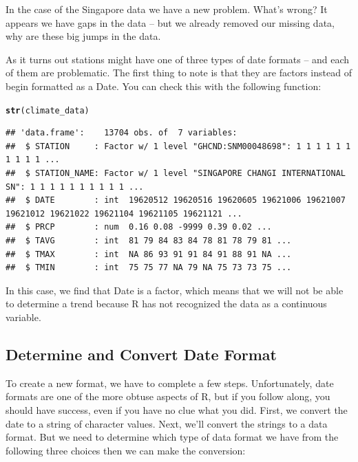 \documentclass{article}\usepackage[]{graphicx}\usepackage[]{color}
\makeatletter
\newcommand{\hlstd}[1]{\textcolor[rgb]{0.345,0.345,0.345}{#1}}%
\newcommand{\hlkwd}[1]{\textcolor[rgb]{0.737,0.353,0.396}{\textbf{#1}}}%
\newenvironment{kframe}{%
 \def\at@end@of@kframe{}%
 \ifinner\ifhmode%
  \def\at@end@of@kframe{\end{minipage}}%
  \begin{minipage}{\columnwidth}%
 \fi\fi%
 \def\FrameCommand##1{\hskip\@totalleftmargin \hskip-\fboxsep
 \colorbox{shadecolor}{##1}\hskip-\fboxsep
     \hskip-\linewidth \hskip-\@totalleftmargin \hskip\columnwidth}%
 \MakeFramed {\advance\hsize-\width
   \@totalleftmargin\z@ \linewidth\hsize
   \@setminipage}}%
 {\par\unskip\endMakeFramed%
 \at@end@of@kframe}
\newenvironment{knitrout}{}{} %
\makeatother
\begin{document}
In the case of the Singapore data we have a new problem. What's wrong? It appears we have gaps in the data -- but we already removed our missing data, why are these big jumps in the data.

As it turns out stations might have one of three types of date formats -- and each of them are problematic. The first thing to note is that they are factors instead of begin formatted as a Date. You can check this with the following function:

\begin{knitrout}
\color{fgcolor}\begin{kframe}
\begin{alltt}
\hlkwd{str}\hlstd{(climate_data)}
\end{alltt}
\begin{verbatim}
## 'data.frame':	13704 obs. of  7 variables:
##  $ STATION     : Factor w/ 1 level "GHCND:SNM00048698": 1 1 1 1 1 1 1 1 1 1 ...
##  $ STATION_NAME: Factor w/ 1 level "SINGAPORE CHANGI INTERNATIONAL SN": 1 1 1 1 1 1 1 1 1 1 ...
##  $ DATE        : int  19620512 19620516 19620605 19621006 19621007 19621012 19621022 19621104 19621105 19621121 ...
##  $ PRCP        : num  0.16 0.08 -9999 0.39 0.02 ...
##  $ TAVG        : int  81 79 84 83 84 78 81 78 79 81 ...
##  $ TMAX        : int  NA 86 93 91 91 84 91 88 91 NA ...
##  $ TMIN        : int  75 75 77 NA 79 NA 75 73 73 75 ...
\end{verbatim}
\end{kframe}
\end{knitrout}

In this case, we find that Date is a factor, which means that we will not be able to determine a trend because R has not recognized the data as a continuous variable. 


\subsection{Determine and Convert Date Format}

To create a new format, we have to complete a few steps. Unfortunately, date formats are one of the more obtuse aspects of R, but if you follow along, you should have success, even if you have no clue what you did. 
First, we convert the date to a string of character values. Next, we'll convert the strings to a data format. But we need to determine which type of data format we have from the following three choices then we can make the conversion:
\end{document}
